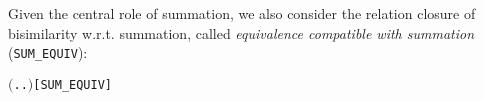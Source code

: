 Given the central role of  
 summation, we also consider the relation closure of bisimilarity
 w.r.t. summation, called \emph{equivalence compatible with summation}
(\texttt{SUM_EQUIV}): %
\begin{alltt}
    \HOLTokenDefEquality{} \ensuremath{(}\HOLTokenLambda{} . \HOLSymConst{\HOLTokenForall{}}.  \HOLSymConst{\ensuremath{+}}  \HOLSymConst{\HOLTokenWeakEQ}  \HOLSymConst{\ensuremath{+}} \ensuremath{)}\hfill{[SUM_EQUIV]}
\end{alltt}

%
